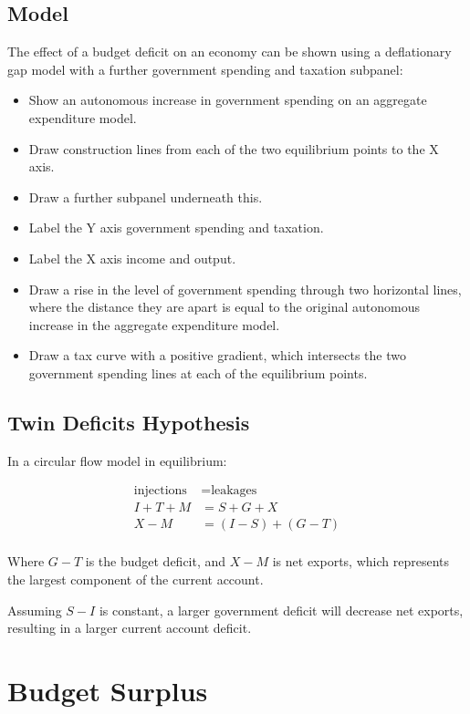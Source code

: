 \documentclass[a4paper,11pt]{report}
\begin{document}
\subsection{Model}

The effect of a budget deficit on an economy can be shown using a deflationary
gap model with a further government spending and taxation subpanel:

\begin{itemize}
\item Show an autonomous increase in government spending on an aggregate
	expenditure model.
\item Draw construction lines from each of the two equilibrium points to the
	X axis.
\item Draw a further subpanel underneath this.
\item Label the Y axis government spending and taxation.
\item Label the X axis income and output.
\item Draw a rise in the level of government spending through two horizontal
	lines, where the distance they are apart is equal to the original autonomous
	increase in the aggregate expenditure model.
\item Draw a tax curve with a positive gradient, which intersects the two
	government spending lines at each of the equilibrium points.
\end{itemize}

\subsection{Twin Deficits Hypothesis}

In a circular flow model in equilibrium:

$$
\begin{aligned}
\text{injections} & = \text{leakages} \\
I + T + M & = S + G + X \\
X - M & = (I - S) + (G - T) \\
\end{aligned}
$$

Where $G - T$ is the budget deficit, and $X - M$ is net exports, which
represents the largest component of the current account.

Assuming $S - I$ is constant, a larger government deficit will decrease net
exports, resulting in a larger current account deficit.


\section{Budget Surplus}
\end{document}
